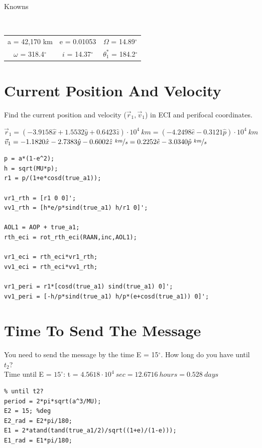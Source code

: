 \documentclass[hidelinks,12pt]{article}
\begin{document}

{\tableofcontents\let\clearpage\relax}
\clearpage
{}
\newpage
\begin{flushleft}
\begin{large}
  Knowns
\end{large}\\
\begin{center}
  \begin{tabular}{ccc}
    a = 42,170 km & e = 0.01053 & $\Omega$ = 14.89$^\circ$\\$\omega$ = 318.4$^\circ$ & $i$ = 14.37$^\circ$ & $\theta_1^*$ = 184.2$^\circ$
  \end{tabular}
\end{center}

\section{Current Position And Velocity}
Find the current position and velocity ($\vec{r}_1,\vec{v}_1$) in ECI and perifocal coordinates.
\begin{center}
  $\vec{r}_1 = (-3.9158 \hat{x} + 1.5532 \hat{y} + 0.6423 \hat{z})\cdot 10^4~km = (-4.2498 \hat{e} -0.3121 \hat{p})\cdot 10^4~km$\\
  $\vec{v}_1 = -1.1820 \hat{x} - 2.7383 \hat{y} - 0.6002 \hat{z}~\nicefrac{km}{s} = 0.2252 \hat{e} - 3.0340 \hat{p}~\nicefrac{km}{s}$
\end{center}
\vspace{5px}
\begin{lstlisting}[frame=lines,style=Matlab-editor,basicstyle = \mlttfamily]
% 1. Find the current position and velocity in ECI and perifocal coordinates
p = a*(1-e^2);
h = sqrt(MU*p);
r1 = p/(1+e*cosd(true_a1));

vr1_rth = [r1 0 0]';
vv1_rth = [h*e/p*sind(true_a1) h/r1 0]';

AOL1 = AOP + true_a1;
rth_eci = rot_rth_eci(RAAN,inc,AOL1);

vr1_eci = rth_eci*vr1_rth;
vv1_eci = rth_eci*vv1_rth;

vr1_peri = r1*[cosd(true_a1) sind(true_a1) 0]';
vv1_peri = [-h/p*sind(true_a1) h/p*(e+cosd(true_a1)) 0]';
\end{lstlisting}
\section{Time To Send The Message}
You need to send the message by the time E = 15$^\circ$. How long do you have until $t_2$?\\
Time until E = $15^\circ$: t = $4.5618\cdot 10^4~sec = 12.6716~hours = 0.528~days$
\vspace{5px}
\begin{lstlisting}[frame=lines,style=Matlab-editor,basicstyle = \mlttfamily]
% 2. You need to send the message by the time E=15deg. How long do you have
% until t2?
period = 2*pi*sqrt(a^3/MU);
E2 = 15; %deg
E2_rad = E2*pi/180;
E1 = 2*atand(tand(true_a1/2)/sqrt((1+e)/(1-e)));
E1_rad = E1*pi/180;


\end{lstlisting}
\end{flushleft}
\end{document}
